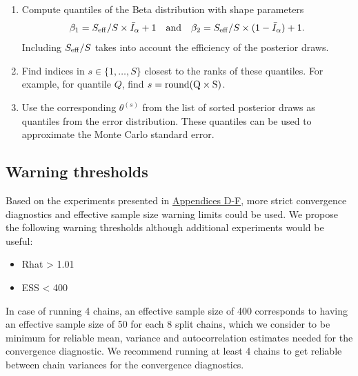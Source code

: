 \documentclass[american,]{article}
\providecommand{\tightlist}{%
  \setlength{\itemsep}{0pt}\setlength{\parskip}{0pt}}
\begin{document}
\begin{enumerate}
\def\labelenumi{\arabic{enumi}.}
\item
  Compute quantiles of the Beta distribution with shape parameters
  \begin{equation}
  \beta_1 = S_{\rm eff} / S \times \bar{I}_\alpha+1 \quad \text{and} \quad
  \beta_2 = S_{\rm eff} / S \times (1-\bar{I}_\alpha) + 1.
  \end{equation} Including \(S_{\rm eff}/S\) takes into account the
  efficiency of the posterior draws.
\item
  Find indices in \(s \in \{1,\ldots,S\}\) closest to the ranks of these
  quantiles. For example, for quantile \(Q\), find
  \(s = {\rm round(Q \times S)}\).
\item
  Use the corresponding \(\theta^{(s)}\) from the list of sorted
  posterior draws as quantiles from the error distribution. These
  quantiles can be used to approximate the Monte Carlo standard error.
\end{enumerate}

\hypertarget{warning-thresholds}{%
\subsection{Warning thresholds}\label{warning-thresholds}}

Based on the experiments presented in
\protect\hyperlink{AppendixD}{Appendices D-F}, more strict convergence
diagnostics and effective sample size warning limits could be used. We
propose the following warning thresholds although additional experiments
would be useful:

\begin{itemize}
\tightlist
\item
  Rhat \textgreater{} 1.01
\item
  ESS \textless{} 400
\end{itemize}

In case of running 4 chains, an effective sample size of 400 corresponds
to having an effective sample size of 50 for each 8 split chains, which
we consider to be minimum for reliable mean, variance and
autocorrelation estimates needed for the convergence diagnostic. We
recommend running at least 4 chains to get reliable between chain
variances for the convergence diagnostics.

\end{document}
